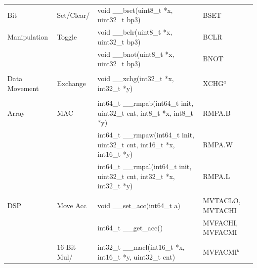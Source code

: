 \begin{table}
\begin{center}
\begin{tabular}{llll}
Bit               & Set/Clear/        & void \_\_bset(uint8\_t *x, uint32\_t bp3)                                    & BSET                     \\
Manipulation      & Toggle            & void \_\_bclr(uint8\_t *x, uint32\_t bp3)                                    & BCLR                     \\
                  &                   & void \_\_bnot(uint8\_t *x, uint32\_t bp3)                                    & BNOT                     \\
                  &                   &                                                                              &                          \\
Data Movement     & Exchange          & void \_\_xchg(int32\_t *x, int32\_t *y)                                      & XCHG$^a$                 \\
                  &                   &                                                                              &                          \\
Array             & MAC               & int64\_t \_\_rmpab(int64\_t init, uint32\_t cnt, int8\_t *x, int8\_t *y)     & RMPA.B                   \\
                  &                   & int64\_t \_\_rmpaw(int64\_t init, uint32\_t cnt, int16\_t *x, int16\_t *y)   & RMPA.W                   \\
                  &                   & int64\_t \_\_rmpal(int64\_t init, uint32\_t cnt, int32\_t *x, int32\_t *y)   & RMPA.L                   \\
                  &                   &                                                                              &                          \\
DSP               & Move Acc          & void \_\_set\_acc(int64\_t a)                                                & MVTACLO, MVTACHI         \\
                  &                   & int64\_t \_\_get\_acc()                                                      & MVFACHI, MVFACMI         \\
                  &                   &                                                                              &                          \\
                  & 16-Bit Mul/       & int32\_t \_\_macl(int16\_t *x, int16\_t *y, uint32\_t cnt)                   & MVFACMI$^b$              \\

\end{tabular}
\end{center}
\end{table}
